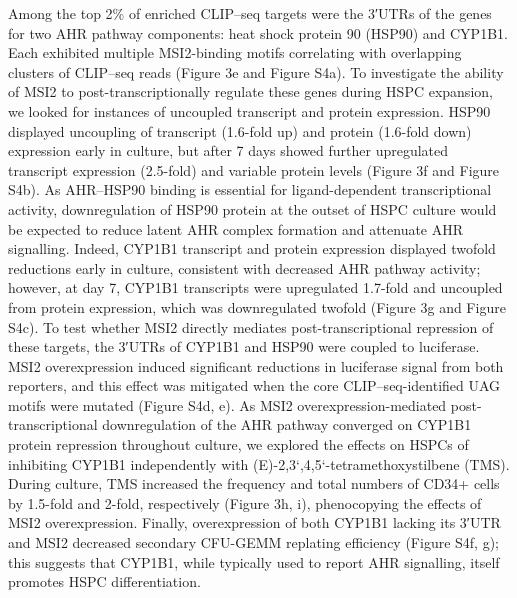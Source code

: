 Among the top 2\% of enriched CLIP–seq targets were the 3′UTRs of the genes for two AHR pathway components: heat shock protein 90 (HSP90) and CYP1B1. Each exhibited multiple MSI2-binding motifs correlating with overlapping clusters of CLIP–seq reads (Figure 3e and Figure S4a). To investigate the ability of MSI2 to post-transcriptionally regulate these genes during HSPC expansion, we looked for instances of uncoupled transcript and protein expression. HSP90 displayed uncoupling of transcript (1.6-fold up) and protein (1.6-fold down) expression early in culture, but after 7 days showed further upregulated transcript expression (2.5-fold) and variable protein levels (Figure 3f and Figure S4b). As AHR–HSP90 binding is essential for ligand-dependent transcriptional activity\cite{Mimura2003}, downregulation of HSP90 protein at the outset of HSPC culture would be expected to reduce latent AHR complex formation and attenuate AHR signalling. Indeed, CYP1B1 transcript and protein expression displayed twofold reductions early in culture, consistent with decreased AHR pathway activity; however, at day 7, CYP1B1 transcripts were upregulated 1.7-fold and uncoupled from protein expression, which was downregulated twofold (Figure 3g and Figure S4c). To test whether MSI2 directly mediates post-transcriptional repression of these targets, the 3′UTRs of CYP1B1 and HSP90 were coupled to luciferase. MSI2 overexpression induced significant reductions in luciferase signal from both reporters, and this effect was mitigated when the core CLIP–seq-identified UAG motifs were mutated (Figure S4d, e). As MSI2 overexpression-mediated post-transcriptional downregulation of the AHR pathway converged on CYP1B1 protein repression throughout culture, we explored the effects on HSPCs of inhibiting CYP1B1 independently with (E)-2,3`,4,5`-tetramethoxystilbene (TMS). During culture, TMS increased the frequency and total numbers of CD34+ cells by 1.5-fold and 2-fold, respectively (Figure 3h, i), phenocopying the effects of MSI2 overexpression. Finally, overexpression of both CYP1B1 lacking its 3′UTR and MSI2 decreased secondary CFU-GEMM replating efficiency (Figure S4f, g); this suggests that CYP1B1, while typically used to report AHR signalling, itself promotes HSPC differentiation.


